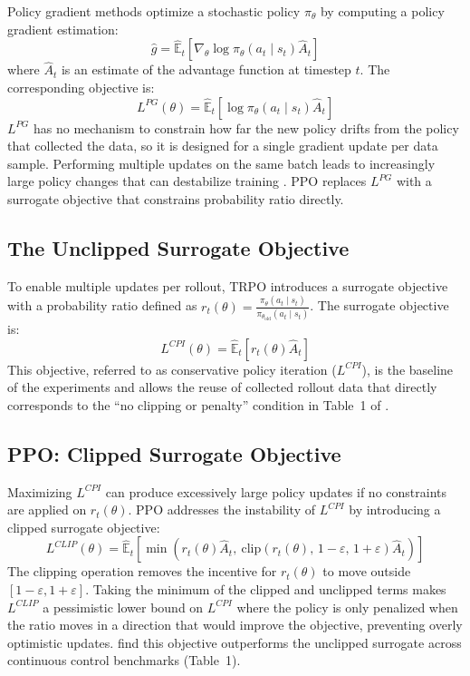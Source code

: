 \documentclass{article}
\begin{document}
Policy gradient methods optimize a stochastic policy $\pi_\theta$ by computing a policy gradient estimation:
\begin{equation}
    \hat{g} = \hat{\mathbb{E}}_t \left[ \nabla_\theta \log \pi_\theta(a_t \mid s_t)
    \hat{A}_t \right]
\end{equation}
where $\hat{A}_t$ is an estimate of the advantage function at timestep $t$. The corresponding objective is:
\begin{equation}
    L^{PG}(\theta) = \hat{\mathbb{E}}_t \left[ \log \pi_\theta(a_t \mid s_t)
    \hat{A}_t \right]
\end{equation}
$L^{PG}$ has no mechanism to constrain how far the new policy drifts from the policy that collected the data, so it is designed for a single gradient update per data sample. Performing multiple updates on the same batch leads to increasingly large policy changes that can destabilize training \citep{schulman2017ppo}. PPO replaces $L^{PG}$ with a surrogate objective that constrains probability ratio directly.

\subsection{The Unclipped Surrogate Objective}

To enable multiple updates per rollout, TRPO introduces a surrogate objective \citep{schulman2017trpo} with a probability ratio defined as
$r_t(\theta) = \frac{\pi_\theta(a_t \mid s_t)}{\pi_{\theta_{\text{old}}}(a_t \mid s_t)}$. The surrogate objective is:
\begin{equation}
    L^{CPI}(\theta) = \hat{\mathbb{E}}_t \left[ r_t(\theta) \hat{A}_t \right]
\end{equation}
This objective, referred to as conservative policy iteration ($L^{CPI}$), is the baseline of the experiments and allows the reuse of collected rollout data that directly corresponds to the ``no clipping or penalty'' condition in Table~1 of \citep{schulman2017ppo}.

\subsection{PPO: Clipped Surrogate Objective}

Maximizing $L^{CPI}$ can produce excessively large policy updates if no constraints are applied on $r_t(\theta)$. PPO addresses the instability of $L^{CPI}$ by introducing a clipped surrogate objective:
\begin{equation}
    L^{CLIP}(\theta) = \hat{\mathbb{E}}_t \left[ \min\left( r_t(\theta)\hat{A}_t,\
    \text{clip}(r_t(\theta),\, 1-\varepsilon,\, 1+\varepsilon)\hat{A}_t \right) \right]
\end{equation}
The clipping operation removes the incentive for $r_t(\theta)$ to move outside $[1-\varepsilon, 1+\varepsilon]$. Taking the minimum of the clipped and unclipped terms makes $L^{CLIP}$ a pessimistic lower bound on $L^{CPI}$ where the policy is only penalized when the ratio moves in a direction that would improve the objective, preventing overly optimistic updates. \citet{schulman2017ppo} find this objective outperforms the unclipped surrogate across continuous control benchmarks (Table~1).
\end{document}
